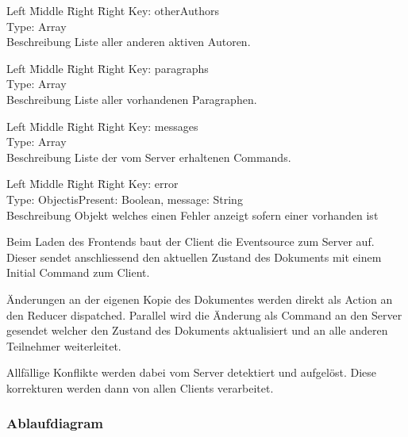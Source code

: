 \begin{tabbing}
    Left \= Middle \= Right \= Right \kill
    Key:  \> \> \> otherAuthors\\
    Type:  \> \> \> Array \\
    Beschreibung \>  \> \> Liste aller anderen aktiven Autoren.\\
\end{tabbing}

\begin{tabbing}
    Left \= Middle \= Right \= Right \kill
    Key:  \> \> \> paragraphs\\
    Type:  \> \> \> Array \\
    Beschreibung \>  \> \> Liste aller vorhandenen Paragraphen.\\
\end{tabbing}

\begin{tabbing}
    Left \= Middle \= Right \= Right \kill
    Key:  \> \> \> messages\\
    Type:  \> \> \> Array \\
    Beschreibung \>  \> \> Liste der vom Server erhaltenen Commands.\\
\end{tabbing}

\begin{tabbing}
    Left \= Middle \= Right \= Right \kill
    Key:  \> \> \> error\\
    Type:  \> \> \> Object{isPresent: Boolean, message: String} \\
    Beschreibung \>  \> \> Objekt welches einen Fehler anzeigt sofern einer vorhanden ist\\
\end{tabbing}

Beim Laden des Frontends baut der Client die Eventsource zum Server auf.
Dieser sendet anschliessend den aktuellen Zustand des Dokuments mit einem Initial Command zum Client.

Änderungen an der eigenen Kopie des Dokumentes werden direkt als Action an den Reducer dispatched.
Parallel wird die Änderung als Command an den Server gesendet welcher den Zustand des Dokuments aktualisiert und an alle anderen Teilnehmer weiterleitet.

Allfällige Konflikte werden dabei vom Server detektiert und aufgelöst.
Diese korrekturen werden dann von allen Clients verarbeitet.

\subsubsection*{Ablaufdiagram}

